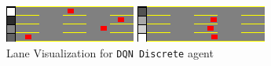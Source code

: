 \begin{figure}[H]
    \centering
    \begin{minipage}{0.48\textwidth}
        \centering
        \includegraphics[width=\linewidth]{plots/part2.1-lane_visualization_00_step_0040.png}
    \end{minipage}
    \hfill
    \begin{minipage}{0.48\textwidth}
        \centering
        \includegraphics[width=\linewidth]{plots/part2.1-lane_visualization_00_step_0200.png}
    \end{minipage}
    \caption{Lane Visualization for \texttt{DQN Discrete} agent}
    \label{fig:part2.1-lane-visualization}
\end{figure}

